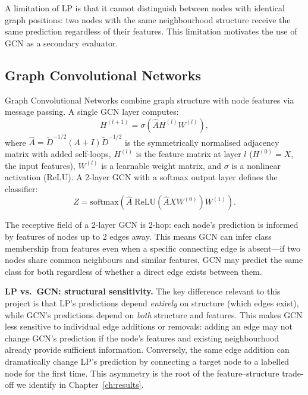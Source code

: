 \documentclass[12pt,a4paper,oneside]{report}
\begin{document}
A limitation of LP is that it cannot distinguish between nodes with identical graph positions: two nodes with the same neighbourhood structure receive the same prediction regardless of their features. This limitation motivates the use of GCN as a secondary evaluator.

\subsection{Graph Convolutional Networks}

Graph Convolutional Networks \citep{kipf} combine graph structure with node features via message passing. A single GCN layer computes:
\begin{equation}
    H^{(l+1)} = \sigma\!\left(\hat{A} H^{(l)} W^{(l)}\right),
\end{equation}
where $\hat{A} = \tilde{D}^{-1/2}(A + I)\tilde{D}^{-1/2}$ is the symmetrically normalised adjacency matrix with added self-loops, $H^{(l)}$ is the feature matrix at layer $l$ ($H^{(0)} = X$, the input features), $W^{(l)}$ is a learnable weight matrix, and $\sigma$ is a nonlinear activation (ReLU). A 2-layer GCN with a softmax output layer defines the classifier:
\begin{equation}
    Z = \text{softmax}\!\left(\hat{A} \; \text{ReLU}\!\left(\hat{A} X W^{(0)}\right) W^{(1)}\right).
\end{equation}

The receptive field of a 2-layer GCN is 2-hop: each node's prediction is informed by features of nodes up to 2 edges away. This means GCN can infer class membership from features even when a specific connecting edge is absent---if two nodes share common neighbours and similar features, GCN may predict the same class for both regardless of whether a direct edge exists between them.

\textbf{LP vs.\ GCN: structural sensitivity.} The key difference relevant to this project is that LP's predictions depend \emph{entirely} on structure (which edges exist), while GCN's predictions depend on \emph{both} structure and features. This makes GCN less sensitive to individual edge additions or removals: adding an edge may not change GCN's prediction if the node's features and existing neighbourhood already provide sufficient information. Conversely, the same edge addition can dramatically change LP's prediction by connecting a target node to a labelled node for the first time. This asymmetry is the root of the feature--structure trade-off we identify in Chapter~\ref{ch:results}.
\end{document}
